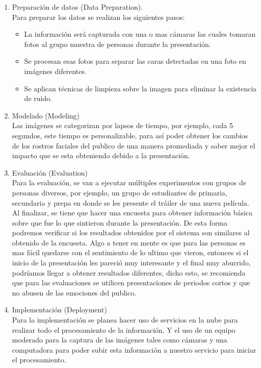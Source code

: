 \begin{enumerate}
      \item Preparación de datos (Data Preparation). \\Para preparar los datos se realizan
            los siguientes pasos:
            \begin{itemize}
                  \item La información será capturada con una o mas cámaras las cuales tomaran fotos al
                        grupo muestra de personas durante la presentación.
                  \item Se procesan esas fotos para separar las caras detectadas en una foto en
                        imágenes diferentes.
                  \item Se aplican técnicas de limpieza sobre la imagen para eliminar la existencia de
                        ruido.
            \end{itemize}

      \item Modelado (Modeling) \\Las imágenes se categorizan por lapsos de tiempo, por
            ejemplo, cada 5 segundos, este tiempo es personalizable, para así poder obtener
            los cambios de los rostros faciales del publico de una manera promediada y
            saber mejor el impacto que se esta obteniendo debido a la presentación.

      \item Evaluación (Evaluation) \\Para la evaluación, se van a ejecutar múltiples
            experimentos con grupos de personas diversos, por ejemplo, un grupo de
            estudiantes de primaria, secundaria y prepa en donde se les presente el tráiler
            de una nueva película. Al finalizar, se tiene que hacer una encuesta para
            obtener información básica sobre que fue lo que sintieron durante la
            presentación. De esta forma podremos verificar si los resultados obtenidos por
            el sistema son similares al obtenido de la encuesta. Algo a tener en mente es
            que para las personas es mas fácil quedarse con el sentimiento de lo ultimo que
            vieron, entonces si el inicio de la presentación les pareció muy interesante y
            el final muy aburrido, podríamos llegar a obtener resultados diferentes, dicho
            esto, se recomienda que para las evaluaciones se utilicen presentaciones de
            periodos cortos y que no abusen de las emociones del publico.

      \item Implementación (Deployment) \\Para la implementación se planea hacer uso de
            servicios en la nube para realizar todo el procesamiento de la información. Y
            el uso de un equipo moderado para la captura de las imágenes tales como cámaras
            y una computadora para poder subir esta información a nuestro servicio para
            iniciar el procesamiento.
\end{enumerate}